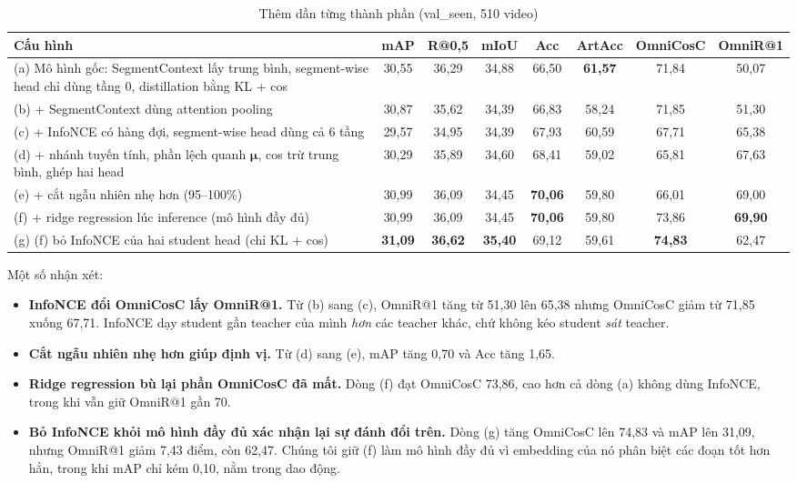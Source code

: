 \documentclass{IEEEtran}
\begin{document}
\begin{table}[t]
\caption{Thêm dần từng thành phần (val\_seen, 510 video)}
\label{tab:ablation}
\centering
\footnotesize
\setlength{\tabcolsep}{4pt}
\begin{tabular}{|p{7.6cm}|c|c|c|c|c|c|c|}
\hline
Cấu hình & mAP & R@0,5 & mIoU & Acc & ArtAcc & OmniCosC & OmniR@1 \\
\hline
(a) Mô hình gốc: SegmentContext lấy trung bình, segment-wise head chỉ dùng tầng 0, distillation bằng KL + cos & 30,55 & 36,29 & 34,88 & 66,50 & \textbf{61,57} & 71,84 & 50,07 \\
(b) + SegmentContext dùng attention pooling & 30,87 & 35,62 & 34,39 & 66,83 & 58,24 & 71,85 & 51,30 \\
(c) + InfoNCE có hàng đợi, segment-wise head dùng cả 6 tầng & 29,57 & 34,95 & 34,39 & 67,93 & 60,59 & 67,71 & 65,38 \\
(d) + nhánh tuyến tính, phần lệch quanh $\boldsymbol{\mu}$, cos trừ trung bình, ghép hai head & 30,29 & 35,89 & 34,60 & 68,41 & 59,02 & 65,81 & 67,63 \\
(e) + cắt ngẫu nhiên nhẹ hơn (95--100\%) & 30,99 & 36,09 & 34,45 & \textbf{70,06} & 59,80 & 66,01 & 69,00 \\
(f) + ridge regression lúc inference (mô hình đầy đủ) & 30,99 & 36,09 & 34,45 & \textbf{70,06} & 59,80 & 73,86 & \textbf{69,90} \\
\hline
(g) (f) bỏ InfoNCE của hai student head (chỉ KL + cos) & \textbf{31,09} & \textbf{36,62} & \textbf{35,40} & 69,12 & 59,61 & \textbf{74,83} & 62,47 \\
\hline
\end{tabular}
\end{table}

Một số nhận xét:
\begin{itemize}
\item \textbf{InfoNCE đổi OmniCosC lấy OmniR@1.} Từ (b) sang (c), OmniR@1 tăng từ 51,30 lên 65,38 nhưng OmniCosC giảm từ 71,85 xuống 67,71. InfoNCE dạy student gần teacher của mình \emph{hơn} các teacher khác, chứ không kéo student \emph{sát} teacher.
\item \textbf{Cắt ngẫu nhiên nhẹ hơn giúp định vị.} Từ (d) sang (e), mAP tăng 0,70 và Acc tăng 1,65.
\item \textbf{Ridge regression bù lại phần OmniCosC đã mất.} Dòng (f) đạt OmniCosC 73,86, cao hơn cả dòng (a) không dùng InfoNCE, trong khi vẫn giữ OmniR@1 gần 70.
\item \textbf{Bỏ InfoNCE khỏi mô hình đầy đủ xác nhận lại sự đánh đổi trên.} Dòng (g) tăng OmniCosC lên 74,83 và mAP lên 31,09, nhưng OmniR@1 giảm 7,43 điểm, còn 62,47. Chúng tôi giữ (f) làm mô hình đầy đủ vì embedding của nó phân biệt các đoạn tốt hơn hẳn, trong khi mAP chỉ kém 0,10, nằm trong dao động.
\end{itemize}
\end{document}
